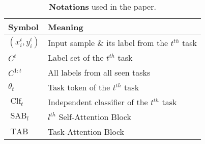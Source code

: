 \begin{table}[t]
    \centering
    \begin{tabular}{@{}l|l@{}}
        \hline
        Symbol                 & Meaning\Tstrut\Bstrut                                   \\
        \hline
        $(x_i^t, y_i^t)$       & Input sample \& its label from the $t^{th}$ task\Tstrut \\
        $C^t$                  & Label set of the $t^{th}$ task                          \\
        $C^{1:t}$              & All labels from all seen tasks                          \\
        $\theta_t$             & Task token of the $t^{th}$ task                         \\
        $\operatorname{Clf}_t$ & Independent classifier of the $t^{th}$ task             \\
        $\operatorname{SAB}_l$ & $l^{th}$ Self-Attention Block                           \\
        $\operatorname{TAB}$   & Task-Attention Block                                    \\
        \hline
    \end{tabular}
    \caption{\textbf{Notations} used in the paper.}
    \label{tab:dytox_notation}
\end{table}
